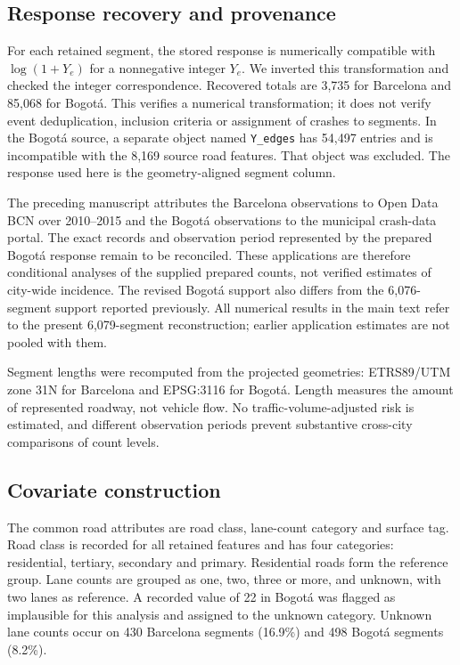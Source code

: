 \documentclass[11pt]{article}
\begin{document}
\subsection{Response recovery and provenance}
For each retained segment, the stored response is numerically compatible with $\log(1+Y_e)$ for a nonnegative integer $Y_e$. We inverted this transformation and checked the integer correspondence. Recovered totals are 3,735 for Barcelona and 85,068 for Bogot\'a. This verifies a numerical transformation; it does not verify event deduplication, inclusion criteria or assignment of crashes to segments. In the Bogot\'a source, a separate object named \texttt{Y\_edges} has 54,497 entries and is incompatible with the 8,169 source road features. That object was excluded. The response used here is the geometry-aligned segment column.

The preceding manuscript attributes the Barcelona observations to Open Data BCN over 2010--2015 and the Bogot\'a observations to the municipal crash-data portal. The exact records and observation period represented by the prepared Bogot\'a response remain to be reconciled. These applications are therefore conditional analyses of the supplied prepared counts, not verified estimates of city-wide incidence. The revised Bogot\'a support also differs from the 6,076-segment support reported previously. All numerical results in the main text refer to the present 6,079-segment reconstruction; earlier application estimates are not pooled with them.

Segment lengths were recomputed from the projected geometries: ETRS89/UTM zone 31N for Barcelona and EPSG:3116 for Bogot\'a. Length measures the amount of represented roadway, not vehicle flow. No traffic-volume-adjusted risk is estimated, and different observation periods prevent substantive cross-city comparisons of count levels.

\subsection{Covariate construction}
The common road attributes are road class, lane-count category and surface tag. Road class is recorded for all retained features and has four categories: residential, tertiary, secondary and primary. Residential roads form the reference group. Lane counts are grouped as one, two, three or more, and unknown, with two lanes as reference. A recorded value of 22 in Bogot\'a was flagged as implausible for this analysis and assigned to the unknown category. Unknown lane counts occur on 430 Barcelona segments (16.9\%) and 498 Bogot\'a segments (8.2\%).
\end{document}
